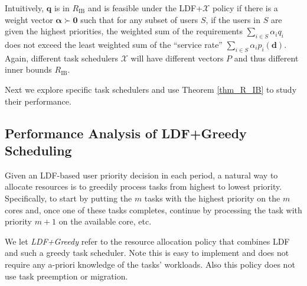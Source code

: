 \documentclass[prodmode,acmtompecs]{acmsmall}
\newcommand{\reqvec}{\mathbf{q}}
\newcommand{\reqscalar}{q}
\newcommand{\ribvec}{\boldsymbol{\alpha}}
\newcommand{\ribscalar}{\alpha}
\newcommand{\taskScheduler}{\mathcal{X}}
\newcommand{\myComments}[1]{}
\newif\ifinfocom
\newif\iftompecs
\newif\ifdissertation
\newcommand{\infocomStart}{\ifinfocom \myComments{Infocom: }}
\newcommand{\tompecsStart}{\iftompecs \myComments{TOMPECS version: }}
\newcommand{\dissertationStart}{\ifdissertation  \myComments{Dissertation version: }}
\newcommand{\commentEnd}{\myComments{End}}
\begin{document}
Intuitively, $\reqvec$ is in $R_\text{IB}$ and is feasible under the LDF+$\taskScheduler$ policy if there is a weight vector $\ribvec \succ \mathbf{0}$ such that for any subset of users $S$, if the users in $S$ are given the highest priorities, the weighted sum of the requirements $\sum\limits_{i \in S}\ribscalar_i \reqscalar_i$ does not exceed the least weighted sum of the ``service rate'' $\sum\limits_{i\in S} {\ribscalar}_i p_i(\mathbf{d})$. Again, different task schedulers $\taskScheduler$ will have different vectors $P$ and thus different inner bounds $R_{\text{IB}}$. 
\infocomStart
For a detailed proof, see the extended version of this paper \cite{EXT}. 
\commentEnd\fi
\tompecsStart
A proof is provided in Appendix \ref{pf_theorem_R_IB}. 
Note that Theorem \ref{thm_R_IB} applies beyond the SRT-MIC model when the LDF policy is used but in a general setting where $\mathbf{p}(\mathbf{d})$ represent the expected payoffs under priority decision $\mathbf{d}$ and users require long-term time-averaged payoff $\reqvec$ per period. The LDF policy can also be generalized to a class of weighted LDF policies. This general result is further developed in \cite{DuD16E}. 
\commentEnd\fi

Next we explore specific task schedulers and use Theorem \ref{thm_R_IB} to study their performance. 

\dissertationStart
Note that Theorem \ref{thm_R_IB} applies beyond the SRT-MIC model when the LDF policy is used but in a general setting where $\mathbf{p}(\mathbf{d})$ represent the expected payoffs under priority decision $\mathbf{d}$ and users require long-term time-averaged payoff $\reqvec$ per period. The LDF policy can also be generalized to a class of weighted LDF policies. This general result is further developed in [?]. 
\commentEnd\fi

\subsection{Performance Analysis of LDF+Greedy Scheduling}
Given an LDF-based user priority decision in each period, a natural way to allocate resources is to greedily process tasks from highest to lowest priority. Specifically, to start by putting the $m$ tasks with the highest priority on the $m$ cores and, once one of these tasks completes, continue by processing the task with priority $m+1$ on the available core, etc.  

We let {\em LDF+Greedy} refer to the resource allocation policy that combines LDF and such a greedy task scheduler. Note this is easy to implement and does not require any a-priori knowledge of the tasks' workloads. Also this policy does not use task preemption or migration. 
\end{document}
